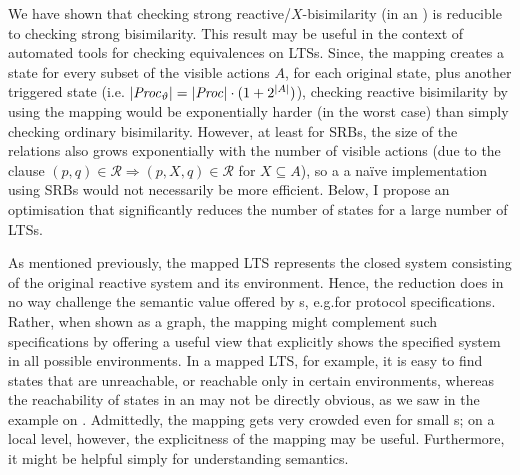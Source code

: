 %
\begin{isabellebody}%
%
%
\isadelimtheory
%
\endisadelimtheory
%
\isatagtheory
%
\endisatagtheory
{\isafoldtheory}%
%
\isadelimtheory
%
\endisadelimtheory
%
\isadelimdocument
%
\endisadelimdocument
%
\isatagdocument
%
\isamarkuptrue%
%
\endisatagdocument
{\isafolddocument}%
%
\isadelimdocument
%
\endisadelimdocument
%
\begin{isamarkuptext}%
\label{chap:discussion}%
\end{isamarkuptext}\isamarkuptrue%
%
\begin{isamarkuptext}%
We have shown that checking strong reactive/$X$-bisimilarity (in an \LTSt{}) is reducible to checking strong bisimilarity. This result may be useful in the context of automated tools for checking equivalences on LTSs.
Since, the mapping creates a state for every subset of the visible actions $A$, for each original state, plus another triggered state (i.e.\@ 
$|\mathit{Proc}_\vartheta| = |\mathit{Proc}| \cdot (1+2^{|A|})$),
checking reactive bisimilarity by using the mapping would be exponentially harder (in the worst case) than simply checking ordinary bisimilarity. However, at least for SRBs, the size of the relations also grows exponentially with the number of visible actions (due to the clause $(p,q)\in\mathcal{R} \Longrightarrow (p,X,q)\in\mathcal{R}$ for $X\subseteq A$), so a a naïve implementation using SRBs would not necessarily be more efficient. Below, I propose an optimisation that significantly reduces the number of states for a large number of LTSs.

As mentioned previously, the mapped LTS represents the closed system consisting of the original reactive system and its environment. Hence, the reduction does in no way challenge the semantic value offered by \LTSt{}s, e.g.\@ for protocol specifications. Rather, when shown as a graph, the mapping might complement such specifications by offering a useful view that explicitly shows the specified system in all possible environments. In a mapped LTS, for example, it is easy to find states that are unreachable, or reachable only in certain environments, whereas the reachability of states in an \LTSt{} may not be directly obvious, as we saw in the example on . Admittedly, the mapping gets very crowded even for small \LTSt{}s; on a local level, however, the explicitness of the mapping may be useful. Furthermore, it might be helpful simply for understanding \LTSt{} semantics.


\end{isamarkuptext}
\end{isabellebody}
